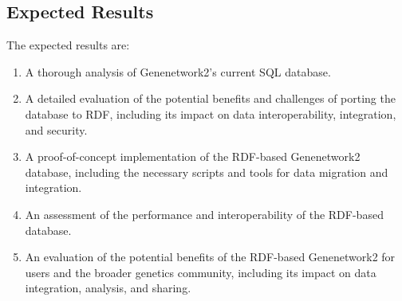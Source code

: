 \subsection{Expected Results}
The expected results are:

\begin{enumerate}
\item A thorough analysis of Genenetwork2's current SQL database.

\item A detailed evaluation of the potential benefits and challenges of porting the database to RDF, including its impact on data interoperability, integration, and security.

\item A proof-of-concept implementation of the RDF-based Genenetwork2 database, including the necessary scripts and tools for data migration and integration.

\item An assessment of the performance and interoperability of the RDF-based database.

\item An evaluation of the potential benefits of the RDF-based Genenetwork2 for users and the broader genetics community, including its impact on data integration, analysis, and sharing.
\end{enumerate}
